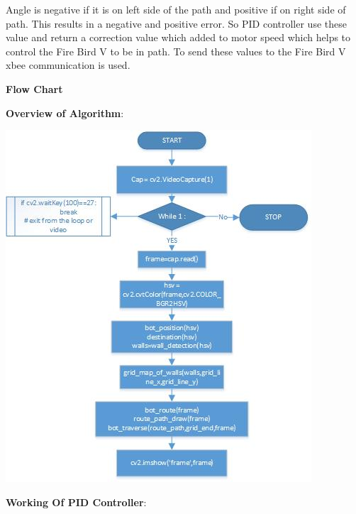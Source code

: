 \documentclass[report]{res}
\begin{document}
	Angle is negative if it is on left side of the path and positive if on right side of path. This results in a negative and positive error. So PID controller use these value and return a correction value which added to motor speed which helps to control the Fire Bird V to be in path. To send these values to the Fire Bird V xbee communication is used.
	
	\pagebreak
	
	
	\begin{center}
		\textbf{\huge Flow Chart} \\
	\end{center}
	
	\textbf{\Large Overview of Algorithm}:\\
	
	\begin{center}
		\includegraphics[scale = 1.2]{graphics/drawing1.jpg}\\
	\end{center}
	
	\pagebreak
	\textbf{\Large Working Of PID Controller}:\\
	
\end{document}
